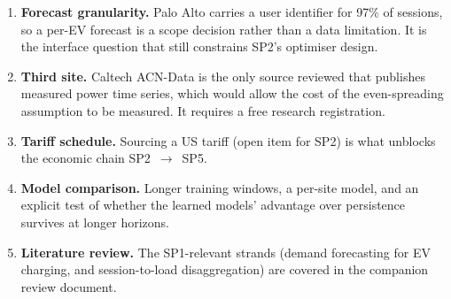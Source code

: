 \documentclass[11pt,a4paper]{article}
\begin{document}
\begin{enumerate}
  \item \textbf{Forecast granularity.} Palo Alto carries a user identifier for 97\% of sessions, so
        a per-EV forecast is a scope decision rather than a data limitation. It is the interface
        question that still constrains SP2's optimiser design.
  \item \textbf{Third site.} Caltech ACN-Data is the only source reviewed that publishes measured
        power time series, which would allow the cost of the even-spreading assumption to be
        measured. It requires a free research registration.
  \item \textbf{Tariff schedule.} Sourcing a US tariff (open item for SP2) is what unblocks the
        economic chain SP2~$\rightarrow$~SP5.
  \item \textbf{Model comparison.} Longer training windows, a per-site model, and an explicit test
        of whether the learned models' advantage over persistence survives at longer horizons.
  \item \textbf{Literature review.} The SP1-relevant strands (demand forecasting for EV charging,
        and session-to-load disaggregation) are covered in the companion review document.
\end{enumerate}

\end{document}
